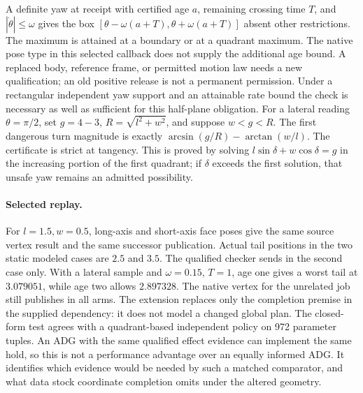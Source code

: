 \documentclass[11pt]{article}
\begin{document}
A definite yaw at receipt with certified age \(a\), remaining crossing
time \(T\), and \(|\dot\theta|\le\omega\) gives the box
\([\theta-\omega(a+T),\theta+\omega(a+T)]\) absent other restrictions.
The maximum is attained at a boundary or at a quadrant maximum.
The native pose type in this selected callback does not supply the
additional age bound. A replaced body, reference frame, or permitted
motion law needs a new qualification; an old positive release is not
a permanent permission. Under a rectangular independent yaw support
and an attainable rate bound the check is necessary as well as
sufficient for this half-plane obligation. For a lateral reading
\(\theta=\pi/2\), set \(g=4-3\),
\(R=\sqrt{l^2+w^2}\), and suppose \(w<g<R\). The first dangerous turn
magnitude is exactly \(\arcsin(g/R)-\arctan(w/l)\).
The certificate is strict at tangency. This is proved by solving
\(l\sin\delta+w\cos\delta=g\) in the increasing portion of the
first quadrant; if \(\delta\) exceeds the first solution, that
unsafe yaw remains an admitted possibility.

\paragraph{Selected replay.}
For \(l=1.5,w=0.5\), long-axis and short-axis face poses give the
same source vertex result and the same successor publication. Actual
tail positions in the two static modeled cases are \(2.5\) and \(3.5\).
The qualified checker sends in the second case only. With a lateral
sample and \(\omega=0.15\), \(T=1\), age one gives a worst tail
at \(3.079051\), while age two allows \(2.897328\).
The native vertex for the unrelated job still publishes in all arms.
The extension replaces only the completion premise in the supplied
dependency: it does not model a changed global plan. The closed-form
test agrees with a quadrant-based independent policy on 972 parameter
tuples. An ADG with the same qualified effect evidence can implement
the same hold, so this is not a performance advantage over an
equally informed ADG. It identifies which evidence would be needed
by such a matched comparator, and what data stock coordinate
completion omits under the altered geometry.
\end{document}
